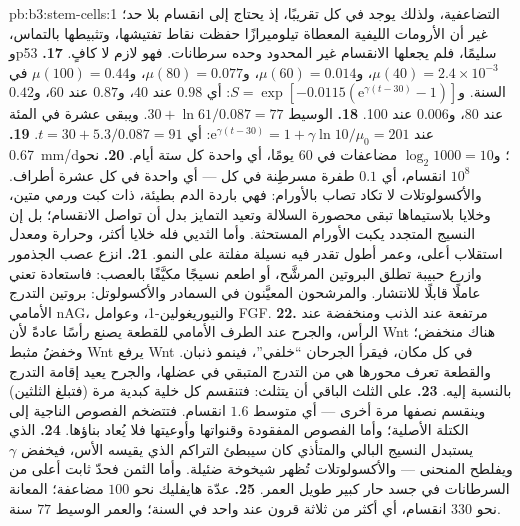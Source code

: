 \begin{solution}{pb:b3:stem-cells:1}
{التضاعفية}، ولذلك يوجد في كل  تقريبًا، إذ يحتاج إلى
انقسام بلا حد؛ غير أن الأرومات الليفية المعطاة تيلوميرازًا
حفظت نقاط تفتيشها، وتثبيطها بالتماس، وp53 سليمًا، فلم يجعلها
الانقسام غير المحدود وحده سرطانات. فهو لازم لا كافٍ.
\textbf{17.} $\mu(40) = 2.4\times 10^{-3}$، و$\mu(60) = 0.014$، و$\mu(80) =
0.077$، و$\mu(100) = 0.44$ في السنة. و$S = \exp[-0.0115(\mathrm{e}^{\gamma
(t-30)} - 1)]$: أي $0.98$ عند 40، و$0.87$ عند 60، و$0.42$ عند 80، و$0.006$ عند
100.
\textbf{18.} الوسيط $30 + \ln 61/0.087 = 77$. ويبقى عشرة في المئة عند
$\mathrm{e}^{\gamma(t-30)} = 1 + \gamma\ln 10/\mu_{0} = 201$: أي $t = 30 +
5.3/0.087 = 91$.
\textbf{19.} \qty{0.67}{mm/d}؛ و$\log_{2}1000 = 10$ مضاعفات في 60
يومًا، أي واحدة كل ستة أيام.
\textbf{20.} نحو $10^{8}$ انقسام، أي $0.1$ طفرة مسرطِنة في كل
 --- أي واحدة في كل عشرة أطراف. والأكسولوتلات لا تكاد
تصاب بالأورام: فهي باردة الدم بطيئة، ذات كبت ورمي متين،
وخلايا بلاستيماها تبقى محصورة السلالة وتعيد التمايز بدل أن
تواصل الانقسام؛ بل إن النسيج المتجدد يكبت الأورام المستحثة.
وأما الثديي فله خلايا أكثر، وحرارة ومعدل استقلاب أعلى، وعمر
أطول تقدر فيه نسيلة مفلتة على النمو.
\textbf{21.} انزع عصب الجذمور وازرع حبيبة تطلق البروتين
المرشَّح، أو اطعم نسيجًا مكيَّفًا بالعصب: فاستعادة 
تعني عاملًا قابلًا للانتشار. والمرشحون المعيَّنون في السمادر
والأكسولوتل: بروتين التدرج الأمامي nAG، والنيوريغولين-1،
وعوامل FGF.
\textbf{22.}  مرتفعة عند الذنب ومنخفضة عند الرأس،
والجرح عند الطرف الأمامي للقطعة يصنع رأسًا عادةً لأن Wnt
هناك منخفض؛ وخفضُ مثبط Wnt يرفع Wnt في كل مكان، فيقرأ
الجرحان ``خلفي''، فينمو ذنبان. والقطعة تعرف محورها هي من
التدرج المتبقي في عضلها، والجرح يعيد إقامة التدرج بالنسبة
إليه.
\textbf{23.} على الثلث الباقي أن يتثلث: فتنقسم كل خلية كبدية
مرة (فتبلغ الثلثين) وينقسم نصفها مرة أخرى --- أي متوسط $1.6$ انقسام.
فتتضخم الفصوص الناجية إلى الكتلة الأصلية؛ وأما الفصوص
المفقودة وقنواتها وأوعيتها فلا يُعاد بناؤها.
\textbf{24.}  الذي يستبدل النسيج البالي والمتأذي كان
سيبطئ التراكم الذي يقيسه الأس، فيخفض $\gamma$ ويفلطح المنحنى
--- والأكسولوتلات تُظهر شيخوخة ضئيلة. وأما الثمن فحدّ ثابت
أعلى من السرطانات في جسد حار كبير طويل العمر.
\textbf{25.} عدّة هايفليك نحو $100$ مضاعفة؛ 
المعانة  نحو $330$ انقسام، أي أكثر من ثلاثة قرون
عند واحد في السنة؛ والعمر الوسيط $77$ سنة.
\end{solution}
